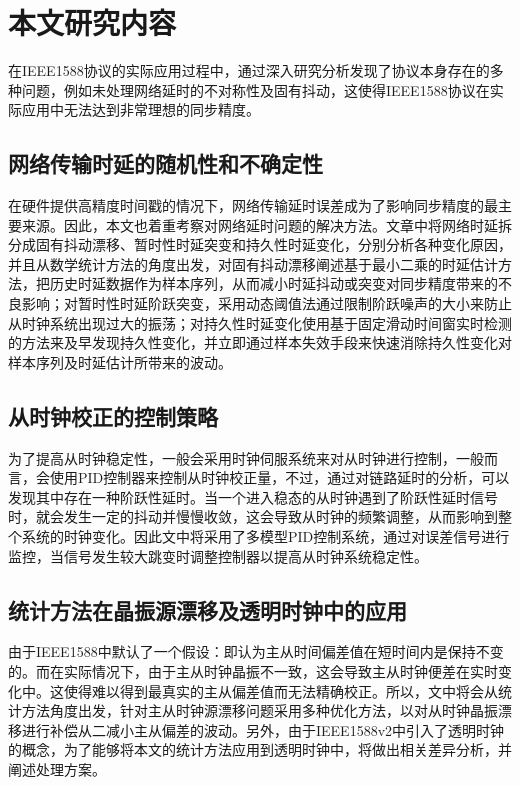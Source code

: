 \section{本文研究内容}
在IEEE1588协议的实际应用过程中，通过深入研究分析发现了协议本身存在的多种问题，例如未处理网络延时的不对称性及固有抖动，这使得IEEE1588协议在实际应用中无法达到非常理想的同步精度。

\subsection{网络传输时延的随机性和不确定性}
在硬件提供高精度时间戳的情况下，网络传输延时误差成为了影响同步精度的最主要来源。因此，本文也着重考察对网络延时问题的解决方法。文章中将网络时延拆分成固有抖动漂移、暂时性时延突变和持久性时延变化，分别分析各种变化原因，并且从数学统计方法的角度出发，对固有抖动漂移阐述基于最小二乘的时延估计方法，把历史时延数据作为样本序列，从而减小时延抖动或突变对同步精度带来的不良影响；对暂时性时延阶跃突变，采用动态阈值法通过限制阶跃噪声的大小来防止从时钟系统出现过大的振荡；对持久性时延变化使用基于固定滑动时间窗实时检测的方法来及早发现持久性变化，并立即通过样本失效手段来快速消除持久性变化对样本序列及时延估计所带来的波动。

\subsection{从时钟校正的控制策略}
为了提高从时钟稳定性，一般会采用时钟伺服系统来对从时钟进行控制，一般而言，会使用PID控制器来控制从时钟校正量，不过，通过对链路延时的分析，可以发现其中存在一种阶跃性延时。当一个进入稳态的从时钟遇到了阶跃性延时信号时，就会发生一定的抖动并慢慢收敛，这会导致从时钟的频繁调整，从而影响到整个系统的时钟变化\supercite{10-11}。因此文中将采用了多模型PID控制系统，通过对误差信号进行监控，当信号发生较大跳变时调整控制器以提高从时钟系统稳定性。

\subsection{统计方法在晶振源漂移及透明时钟中的应用}
由于IEEE1588中默认了一个假设：即认为主从时间偏差值在短时间内是保持不变的。而在实际情况下，由于主从时钟晶振不一致，这会导致主从时钟便差在实时变化中。这使得难以得到最真实的主从偏差值而无法精确校正。所以，文中将会从统计方法角度出发，针对主从时钟源漂移问题采用多种优化方法，以对从时钟晶振漂移进行补偿从二减小主从偏差的波动。另外，由于IEEE1588v2中引入了透明时钟的概念，为了能够将本文的统计方法应用到透明时钟中，将做出相关差异分析，并阐述处理方案。

